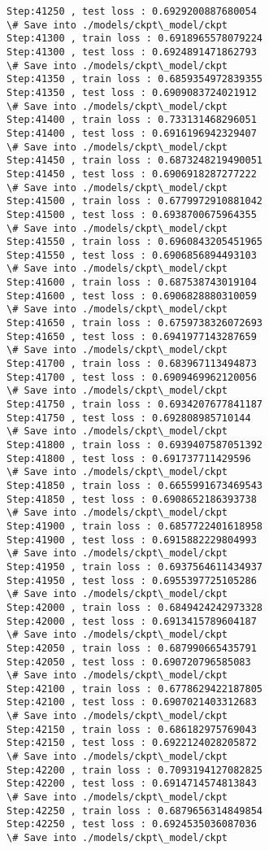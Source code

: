 \documentclass[11pt]{article}
\begin{document}
\begin{Verbatim}[commandchars=\\\{\}]
Step:41250 , test loss : 0.6929200887680054
\# Save into ./models/ckpt\_model/ckpt
Step:41300 , train loss : 0.6918965578079224
Step:41300 , test loss : 0.6924891471862793
\# Save into ./models/ckpt\_model/ckpt
Step:41350 , train loss : 0.6859354972839355
Step:41350 , test loss : 0.6909083724021912
\# Save into ./models/ckpt\_model/ckpt
Step:41400 , train loss : 0.733131468296051
Step:41400 , test loss : 0.6916196942329407
\# Save into ./models/ckpt\_model/ckpt
Step:41450 , train loss : 0.6873248219490051
Step:41450 , test loss : 0.6906918287277222
\# Save into ./models/ckpt\_model/ckpt
Step:41500 , train loss : 0.6779972910881042
Step:41500 , test loss : 0.6938700675964355
\# Save into ./models/ckpt\_model/ckpt
Step:41550 , train loss : 0.6960843205451965
Step:41550 , test loss : 0.6906856894493103
\# Save into ./models/ckpt\_model/ckpt
Step:41600 , train loss : 0.687538743019104
Step:41600 , test loss : 0.6906828880310059
\# Save into ./models/ckpt\_model/ckpt
Step:41650 , train loss : 0.6759738326072693
Step:41650 , test loss : 0.6941977143287659
\# Save into ./models/ckpt\_model/ckpt
Step:41700 , train loss : 0.683967113494873
Step:41700 , test loss : 0.6909469962120056
\# Save into ./models/ckpt\_model/ckpt
Step:41750 , train loss : 0.6934207677841187
Step:41750 , test loss : 0.692808985710144
\# Save into ./models/ckpt\_model/ckpt
Step:41800 , train loss : 0.6939407587051392
Step:41800 , test loss : 0.691737711429596
\# Save into ./models/ckpt\_model/ckpt
Step:41850 , train loss : 0.6655991673469543
Step:41850 , test loss : 0.6908652186393738
\# Save into ./models/ckpt\_model/ckpt
Step:41900 , train loss : 0.6857722401618958
Step:41900 , test loss : 0.6915882229804993
\# Save into ./models/ckpt\_model/ckpt
Step:41950 , train loss : 0.6937564611434937
Step:41950 , test loss : 0.6955397725105286
\# Save into ./models/ckpt\_model/ckpt
Step:42000 , train loss : 0.6849424242973328
Step:42000 , test loss : 0.6913415789604187
\# Save into ./models/ckpt\_model/ckpt
Step:42050 , train loss : 0.687990665435791
Step:42050 , test loss : 0.690720796585083
\# Save into ./models/ckpt\_model/ckpt
Step:42100 , train loss : 0.6778629422187805
Step:42100 , test loss : 0.6907021403312683
\# Save into ./models/ckpt\_model/ckpt
Step:42150 , train loss : 0.686182975769043
Step:42150 , test loss : 0.6922124028205872
\# Save into ./models/ckpt\_model/ckpt
Step:42200 , train loss : 0.7093194127082825
Step:42200 , test loss : 0.6914714574813843
\# Save into ./models/ckpt\_model/ckpt
Step:42250 , train loss : 0.6879656314849854
Step:42250 , test loss : 0.6924535036087036
\# Save into ./models/ckpt\_model/ckpt

\end{Verbatim}
\end{document}
